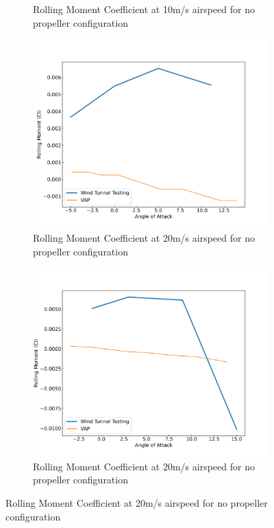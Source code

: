 \begin{figure}[H]
\begin{subfigure}[b]{0.46\textwidth}
        \caption{Rolling Moment Coefficient at 10m/s airspeed for no propeller configuration}
        \label{fig:VAP_NoProp_Cl_10ms_11000}
    \end{subfigure}
    \begin{subfigure}[b]{0.467\textwidth}
        \centering
        \includegraphics[width=\textwidth]{05_Results/VAP/noProp/Cl/20ms_6000RPM_Cl.png}
        \caption{Rolling Moment Coefficient at 20m/s airspeed for no propeller configuration}
        \label{fig:VAP_NoProp_Cl_20ms_6000}
    \end{subfigure}
    \begin{subfigure}[b]{0.467\textwidth}
        \centering
        \includegraphics[width=\textwidth]{05_Results/VAP/noProp/Cl/20ms_11000RPM_Cl.png}
        \caption{Rolling Moment Coefficient at 20m/s airspeed for no propeller configuration}
        \label{fig:VAP_NoProp_Cl_20ms_11000}
    \end{subfigure}
\end{figure}


